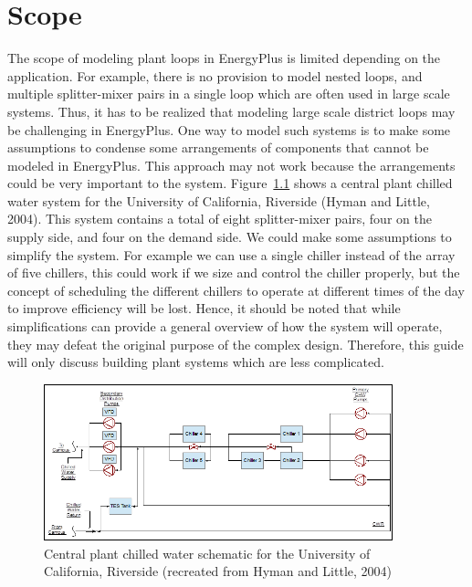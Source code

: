 \chapter{Scope}\label{scope}

The scope of modeling plant loops in EnergyPlus is limited depending on the application. For example, there is no provision to model nested loops, and multiple splitter-mixer pairs in a single loop which are often used in large scale systems. Thus, it has to be realized that modeling large scale district loops may be challenging in EnergyPlus. One way to model such systems is to make some assumptions to condense some arrangements of components that cannot be modeled in EnergyPlus. This approach may not work because the arrangements could be very important to the system. Figure~\ref{fig:central-plant-chilled-water-schematic-for} shows a central plant chilled water system for the University of California, Riverside (Hyman and Little, 2004). This system contains a total of eight splitter-mixer pairs, four on the supply side, and four on the demand side. We could make some assumptions to simplify the system. For example we can use a single chiller instead of the array of five chillers, this could work if we size and control the chiller properly, but the concept of scheduling the different chillers to operate at different times of the day to improve efficiency will be lost. Hence, it should be noted that while simplifications can provide a general overview of how the system will operate, they may defeat the original purpose of the complex design. Therefore, this guide will only discuss building plant systems which are less complicated.

\begin{figure}[hbtp] %
\centering
\includegraphics[width=0.9\textwidth, height=0.9\textheight, keepaspectratio=true]{media/image001.png}
\caption{Central plant chilled water schematic for the University of California, Riverside (recreated from Hyman and Little, 2004) \protect \label{fig:central-plant-chilled-water-schematic-for}}
\end{figure}
